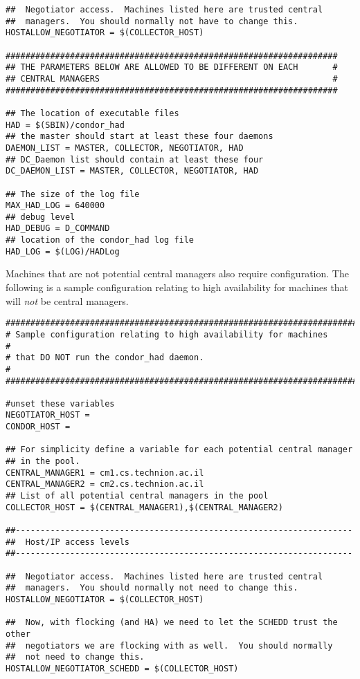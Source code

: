\begin{verbatim}
##  Negotiator access.  Machines listed here are trusted central
##  managers.  You should normally not have to change this.
HOSTALLOW_NEGOTIATOR = $(COLLECTOR_HOST)

###################################################################
## THE PARAMETERS BELOW ARE ALLOWED TO BE DIFFERENT ON EACH       #
## CENTRAL MANAGERS                                               #
###################################################################

## The location of executable files
HAD = $(SBIN)/condor_had
## the master should start at least these four daemons
DAEMON_LIST = MASTER, COLLECTOR, NEGOTIATOR, HAD
## DC_Daemon list should contain at least these four
DC_DAEMON_LIST = MASTER, COLLECTOR, NEGOTIATOR, HAD

## The size of the log file
MAX_HAD_LOG = 640000
## debug level 
HAD_DEBUG = D_COMMAND
## location of the condor_had log file
HAD_LOG = $(LOG)/HADLog
\end{verbatim}
\normalsize

Machines that are not potential central managers also 
require configuration.
The following is a sample configuration relating to
high availability for machines that will \emph{not} be central managers.

\footnotesize
\begin{verbatim}
##########################################################################
# Sample configuration relating to high availability for machines        # 
# that DO NOT run the condor_had daemon.                                 #
##########################################################################

#unset these variables 
NEGOTIATOR_HOST =
CONDOR_HOST =

## For simplicity define a variable for each potential central manager
## in the pool. 
CENTRAL_MANAGER1 = cm1.cs.technion.ac.il
CENTRAL_MANAGER2 = cm2.cs.technion.ac.il
## List of all potential central managers in the pool
COLLECTOR_HOST = $(CENTRAL_MANAGER1),$(CENTRAL_MANAGER2)

##--------------------------------------------------------------------
##  Host/IP access levels
##--------------------------------------------------------------------

##  Negotiator access.  Machines listed here are trusted central
##  managers.  You should normally not need to change this.
HOSTALLOW_NEGOTIATOR = $(COLLECTOR_HOST)

##  Now, with flocking (and HA) we need to let the SCHEDD trust the other 
##  negotiators we are flocking with as well.  You should normally 
##  not need to change this.
HOSTALLOW_NEGOTIATOR_SCHEDD = $(COLLECTOR_HOST) 
\end{verbatim}
\normalsize

